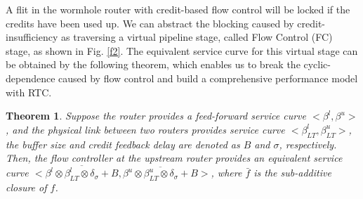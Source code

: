 \documentclass[preprint]{elsarticle}
\newtheorem{thm}{Theorem}
\begin{document}
A flit in the wormhole router with credit-based flow control will be locked if the credits have been used up. We can abstract the blocking caused by credit-insufficiency as traversing a virtual pipeline stage, called Flow Control (FC) stage, as shown in Fig. \ref{f2}. The equivalent service curve for this virtual stage can be obtained by the following theorem, which enables us to break the cyclic-dependence caused by flow control and build a comprehensive performance model with RTC.
\begin{thm}\label{credit}
Suppose the router provides a feed-forward service curve $<\beta^l,\beta^u>$, and the physical link between two routers provides service curve $<\beta_{LT}^l,\beta_{LT}^u>$, the buffer size and credit feedback delay are denoted as $B$ and $\sigma$, respectively. Then, the flow controller at the upstream router provides an equivalent service curve $<\overline{\beta^l\otimes\beta_{LT}^l\otimes\delta_{\sigma}+B},\overline{\beta^u\otimes\beta_{LT}^u\otimes\delta_{\sigma}+B}>$, where $\bar{f}$ is the sub-additive closure \cite{Boudec2001Network} of $f$.
\end{thm}
\end{document}
